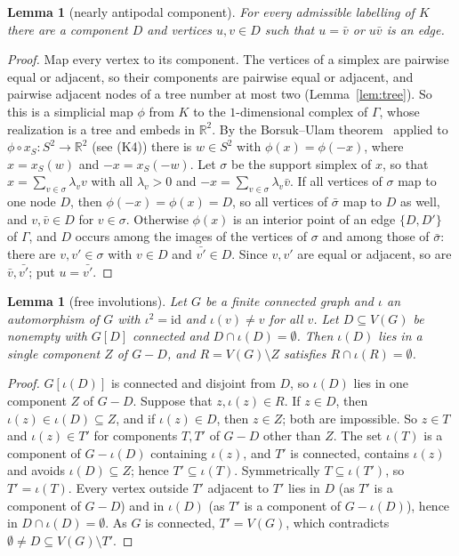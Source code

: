 \documentclass[11pt,letterpaper]{article}
\newtheorem{lemma}[theorem]{Lemma}
\theoremstyle{definition}
\newcommand{\R}{\mathbb{R}}
\begin{document}
\begin{lemma}[nearly antipodal component]\label{lem:nearlyantipodal}
For every admissible labelling of $K$ there are a component $D$ and vertices $u,v\in D$ such that
$u=\bar v$ or $u\bar v$ is an edge.
\end{lemma}

\begin{proof}
Map every vertex to its component. The vertices of a simplex are pairwise equal or adjacent, so
their components are pairwise equal or adjacent, and pairwise adjacent nodes of a tree number at
most two (Lemma~\ref{lem:tree}). So this is a simplicial map $\phi$ from $K$ to the $1$-dimensional
complex of $\Gamma$, whose realization is a tree and embeds in $\R^2$. By the Borsuk--Ulam
theorem~\cite{Mat03} applied to $\phi\circ x_S\colon S^2\to\R^2$ (see (K4)) there is $w\in S^2$ with
$\phi(x)=\phi(-x)$, where $x=x_S(w)$ and $-x=x_S(-w)$. Let $\sigma$ be the support simplex of $x$, so
that $x=\sum_{v\in\sigma}\lambda_vv$ with all $\lambda_v>0$ and $-x=\sum_{v\in\sigma}\lambda_v\bar v$.
If all vertices of $\sigma$ map to one node $D$, then $\phi(-x)=\phi(x)=D$, so all vertices of
$\bar\sigma$ map to $D$ as well, and $v,\bar v\in D$ for $v\in\sigma$. Otherwise $\phi(x)$ is an
interior point of an edge $\{D,D'\}$ of $\Gamma$, and $D$ occurs among the images of the vertices of
$\sigma$ and among those of $\bar\sigma$: there are $v,v'\in\sigma$ with $v\in D$ and $\bar{v'}\in D$.
Since $v,v'$ are equal or adjacent, so are $\bar v,\bar{v'}$; put $u=\bar{v'}$.
\end{proof}

\begin{lemma}[free involutions]\label{lem:invsep}
Let $G$ be a finite connected graph and $\iota$ an automorphism of $G$ with $\iota^2=\mathrm{id}$
and $\iota(v)\ne v$ for all $v$. Let $D\subseteq V(G)$ be nonempty with $G[D]$ connected and
$D\cap\iota(D)=\emptyset$. Then $\iota(D)$ lies in a single component $Z$ of $G-D$, and
$R=V(G)\setminus Z$ satisfies $R\cap\iota(R)=\emptyset$.
\end{lemma}

\begin{proof}
$G[\iota(D)]$ is connected and disjoint from $D$, so $\iota(D)$ lies in one component $Z$ of $G-D$.
Suppose that $z,\iota(z)\in R$. If $z\in D$, then $\iota(z)\in\iota(D)\subseteq Z$, and if
$\iota(z)\in D$, then $z\in Z$; both are impossible. So $z\in T$ and $\iota(z)\in T'$ for components
$T,T'$ of $G-D$ other than $Z$. The set $\iota(T)$ is a component of $G-\iota(D)$ containing
$\iota(z)$, and $T'$ is connected, contains $\iota(z)$ and avoids $\iota(D)\subseteq Z$; hence
$T'\subseteq\iota(T)$. Symmetrically $T\subseteq\iota(T')$, so $T'=\iota(T)$. Every vertex outside
$T'$ adjacent to $T'$ lies in $D$ (as $T'$ is a component of $G-D$) and in $\iota(D)$ (as $T'$ is a
component of $G-\iota(D)$), hence in $D\cap\iota(D)=\emptyset$. As $G$ is connected, $T'=V(G)$, which
contradicts $\emptyset\ne D\subseteq V(G)\setminus T'$.
\end{proof}
\end{document}
